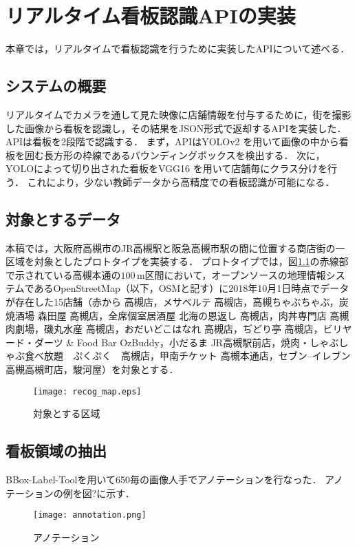 \chapter{リアルタイム看板認識APIの実装}
\label{chapter:implement_recog}
本章では，リアルタイムで看板認識を行うために実装したAPIについて述べる．

\section{システムの概要}
  リアルタイムでカメラを通して見た映像に店舗情報を付与するために，街を撮影した画像から看板を認識し，その結果をJSON形式で返却するAPIを実装した\cite{Kitamura:2018}．
  APIは看板を2段階で認識する．
  まず，APIはYOLOv2 \cite{Redmon:2017}を用いて画像の中から看板を囲む長方形の枠線であるバウンディングボックスを検出する．
  次に，YOLOによって切り出された看板をVGG16 \cite{Simonyan:2015}を用いて店舗毎にクラス分けを行う．
  これにより，少ない教師データから高精度での看板認識が可能になる．
  
\section{対象とするデータ}
  本稿では，大阪府高槻市のJR高槻駅と阪急高槻市駅の間に位置する商店街の一区域を対象としたプロトタイプを実装する．
  プロトタイプでは，図\ref{figure:recog_map}の赤線部で示されている高槻本通の$100\, \mathrm{m}$区間において，オープンソースの地理情報システムであるOpenStreetMap（以下，OSMと記す）\cite{Haklay:2008}に2018年10月1日時点でデータが存在した15店舗（赤から 高槻店，メサベルテ 高槻店，高槻ちゃぶちゃぶ，炭焼酒場 森田屋 高槻店，全席個室居酒屋 北海の恩返し 高槻店，肉丼専門店 高槻肉劇場，磯丸水産 高槻店，おだいどこはなれ 高槻店，ぢどり亭 高槻店，ビリヤード・ダーツ \& Food Bar OzBuddy，小だるま JR高槻駅前店，焼肉・しゃぶしゃぶ食べ放題　ぷくぷく　高槻店，甲南チケット 高槻本通店，セブン--イレブン 高槻高槻町店，駿河屋）を対象とする．
  \begin{figure}[tb]
    \centerline{\texttt{[image: recog\_map.eps]}}
    \caption{対象とする区域}
    \label{figure:recog_map}
  \end{figure}

\section{看板領域の抽出}
  BBox-Label-Toolを用いて650毎の画像人手でアノテーションを行なった．
  アノテーションの例を図?に示す．
  \begin{figure}[tb]
    \centerline{\texttt{[image: annotation.png]}}
    \caption{アノテーション}
    \label{figure:annotation}
  \end{figure}

